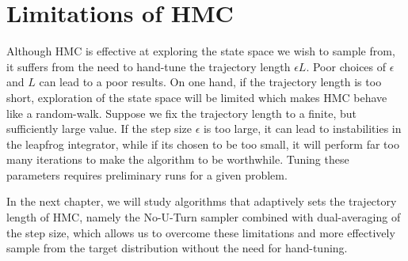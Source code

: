 \section{Limitations of HMC}
Although HMC is effective at exploring the state space we wish to sample from, it suffers from the need to hand-tune
the trajectory length $\epsilon L$. Poor choices of $\epsilon$ and $L$ can lead to a poor results.
On one hand, if the trajectory length is too short, exploration of the state space will be limited 
which makes HMC behave like a random-walk. Suppose we fix the trajectory length to a finite,
but sufficiently large value.
If the step size $\epsilon$ is too large,
it can lead to instabilities in the leapfrog integrator, while if its chosen to be too small, it will perform far too many
iterations to make the algorithm to be worthwhile. 
Tuning these parameters requires preliminary runs for a given problem. 

In the next chapter, we will study algorithms that adaptively sets the trajectory length of HMC,
namely the No-U-Turn sampler combined with dual-averaging of the step size, which allows us to overcome these
limitations and more effectively sample from the target distribution without the need for hand-tuning.

